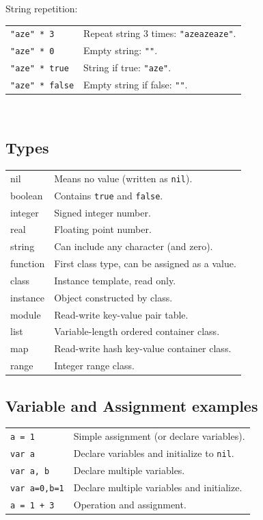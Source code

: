 \hangpar String repetition:

\begin{tabular}{@{}lp{}}
\texttt{"aze" * 3} & Repeat string 3 times: \texttt{"azeazeaze"}. \\
\texttt{"aze" * 0} & Empty string: \texttt{""}. \\
\texttt{"aze" * true} & String if true: \texttt{"aze"}. \\
\texttt{"aze" * false} & Empty string if false: \texttt{""}. \\
\end{tabular}\\

\subsection*{Types}
\begin{tabular}{@{}ll}
    \textsf{nil} & Means no value (written as \texttt{nil}). \\
    \textsf{boolean} & Contains \texttt{true} and \texttt{false}. \\
    \textsf{integer} & Signed integer \textsf{number}. \\
    \textsf{real} & Floating point \textsf{number}. \\
    \textsf{string} & Can include any character (and zero). \\
    \textsf{function} & First class type, can be assigned as a value. \\
    \textsf{class} & Instance template, read only. \\
    \textsf{instance} & Object constructed by class. \\
    \textsf{module} & Read-write key-value pair table. \\
    \textsf{list} & Variable-length ordered container class. \\
    \textsf{map} &  Read-write hash key-value container class. \\
    \textsf{range} & Integer range class. \\
\end{tabular}

\subsection*{Variable and Assignment examples}
\begin{tabular}{@{}ll}
    \texttt{a = 1} & Simple assignment (or declare variables). \\
    \texttt{var a} & Declare variables and initialize to \texttt{nil}. \\
    \texttt{var a, b} & Declare multiple variables. \\
    \texttt{var a=0,b=1} & Declare multiple variables and initialize. \\
    \texttt{a = 1 + 3} & Operation and assignment. \\
\end{tabular}

